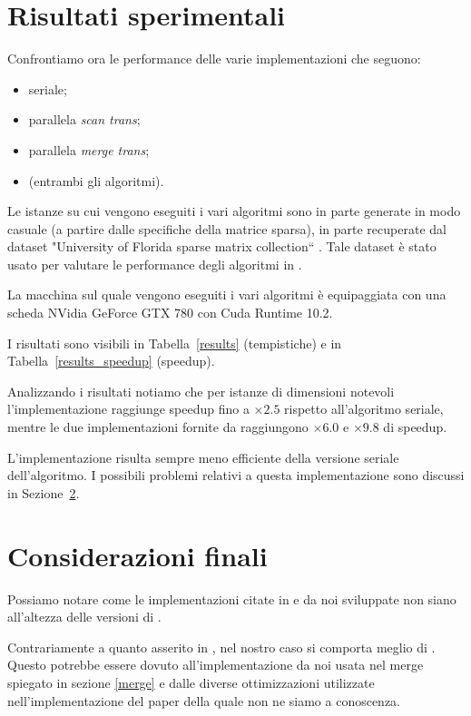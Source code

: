 

\section{Risultati sperimentali}

Confrontiamo ora le performance delle varie implementazioni che seguono:
\begin{itemize}
    \item seriale;
    \item parallela \emph{scan trans};
    \item parallela \emph{merge trans};
    \item \cuSPARSE (entrambi gli algoritmi).
\end{itemize}

Le istanze su cui vengono eseguiti i vari algoritmi sono in parte generate in modo casuale (a partire dalle specifiche della matrice sparsa), in parte recuperate dal dataset "University  of Florida sparse  matrix collection`` \cite{dataset}. Tale dataset è stato usato per valutare le performance degli algoritmi in \cite{parallelTrans}.

La macchina sul quale vengono eseguiti i vari algoritmi è equipaggiata con una scheda NVidia GeForce GTX 780 con Cuda Runtime 10.2.

I risultati sono visibili in Tabella~\ref{results} (tempistiche) e in Tabella~\ref{results_speedup} (speedup).

Analizzando i risultati notiamo che per istanze di dimensioni notevoli l'implementazione \ScanTrans{} raggiunge speedup fino a $\times 2.5$ rispetto all'algoritmo seriale, mentre le due implementazioni fornite da \cuSPARSE{} raggiungono $\times 6.0$ e $\times 9.8$ di speedup. 

L'implementazione \MergeTrans{} risulta sempre meno efficiente della versione seriale dell'algoritmo. I possibili problemi relativi a questa implementazione sono discussi in Sezione~\ref{conclusioni}.





\section{Considerazioni finali}\label{conclusioni}

Possiamo notare come le implementazioni citate in \cite{parallelTrans} e da noi sviluppate non siano all'altezza delle versioni di \cuSPARSE.

Contrariamente a quanto asserito in \cite{parallelTrans}, nel nostro caso \ScanTrans si comporta meglio di \MergeTrans. Questo potrebbe essere dovuto all'implementazione da noi usata nel merge spiegato in sezione \ref{merge} e dalle diverse ottimizzazioni utilizzate nell'implementazione del paper della quale non ne siamo a conoscenza.

